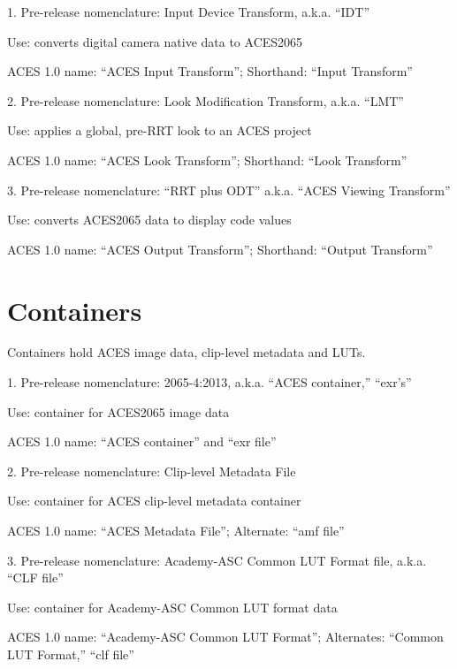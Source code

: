 1. Pre-release nomenclature: Input Device Transform, a.k.a. ``IDT''

Use: converts digital camera native data to ACES2065

ACES 1.0 name: ``ACES Input Transform''; Shorthand: ``Input Transform''

\vspace{10pt}
2. Pre-release nomenclature: Look Modification Transform, a.k.a. ``LMT''

Use: applies a global, pre-RRT look to an ACES project

ACES 1.0 name: ``ACES Look Transform''; Shorthand: ``Look Transform''

\vspace{10pt}
3. Pre-release nomenclature: ``RRT plus ODT'' a.k.a. ``ACES Viewing Transform''

Use: converts ACES2065 data to display code values

ACES 1.0 name: ``ACES Output Transform''; Shorthand: ``Output Transform''

\section{Containers}
Containers hold ACES image data, clip-level metadata and LUTs.

1. Pre-release nomenclature: 2065-4:2013, a.k.a. ``ACES container,'' ``exr’s''

Use: container for ACES2065 image data

ACES 1.0 name: ``ACES container'' and ``exr file'' 

\vspace{10pt}
2. Pre-release nomenclature: Clip-level Metadata File

Use: container for ACES clip-level metadata container

ACES 1.0 name: ``ACES Metadata File''; Alternate: ``amf file''

\vspace{10pt}
3. Pre-release nomenclature: Academy-ASC Common LUT Format file, a.k.a. ``CLF file''

Use: container for Academy-ASC Common LUT format data

ACES 1.0 name: ``Academy-ASC Common LUT Format''; Alternates: ``Common LUT Format,''  ``clf file''